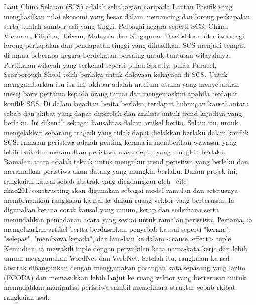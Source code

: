 \documentclass[twoside]{utmthesis}
\begin{document}
\begin{abstrak}
Laut China Selatan (SCS) adalah sebahagian daripada Lautan Pasifik yang menghasilkan nilai ekonomi yang besar dalam memancing dan lorong perkapalan serta jumlah sumber asli yang tinggi. Pelbagai negara seperti SCS, China, Vietnam, Filipina, Taiwan, Malaysia dan Singapura. Disebabkan lokasi strategi lorong perkapalan dan pendapatan tinggi yang dihasilkan, SCS menjadi tempat di mana beberapa negara berdekatan bersaing untuk tuntutan wilayahnya. Pertikaian wilayah yang terkenal seperti pulau Spratly, pulau Paracel, Scarborough Shoal telah berlaku untuk dakwaan kekayaan di SCS. Untuk menggambarkan isu-isu ini, akhbar adalah medium utama yang menyebarkan mesej baris pertama kepada orang ramai dan mengemaskini apabila terdapat konflik SCS. Di dalam kejadian berita berlaku, terdapat hubungan kausal antara sebab dan akibat yang dapat diperoleh dan analisis untuk trend kejadian yang berlaku. Ini dikenali sebagai kausalitas dalam artikel berita. Selain itu, untuk mengelakkan sebarang tragedi yang tidak dapat dielakkan berlaku dalam konflik SCS, ramalan peristiwa adalah penting kerana ia memberikan wawasan yang lebih baik dan meramalkan peristiwa masa depan yang mungkin berlaku. Ramalan acara adalah teknik untuk mengukur trend peristiwa yang berlaku dan meramalkan peristiwa akan datang yang mungkin berlaku. Dalam projek ini, rangkaian kausal sebab abstrak yang dicadangkan oleh \ cite {zhao2017constructing} akan digunakan sebagai model ramalan dan seterusnya membenamkan rangkaian kausal ke dalam ruang vektor yang berterusan. Ia digunakan kerana corak kausal yang umum, kerap dan sederhana serta memudahkan pemadanan acara yang sesuai untuk ramalan peristiwa. Pertama, ia mengeluarkan artikel berita berdasarkan penyebab kausal seperti "kerana", "selepas", "membawa kepada", dan lain-lain ke dalam <cause, effect> tuple. Kemudian, ia mewakili tuple dengan perwakilan kata nama-kata kerja dan lebih umum menggunakan WordNet dan VerbNet. Setelah itu, rangkaian kausal abstrak dibangunkan dengan menggunakan pasangan kata sepasang yang lazim (FCOPA) dan memasukkan lebih lanjut ke ruang vektor yang berterusan untuk memudahkan manipulasi peristiwa sambil memelihara struktur sebab-akibat rangkaian asal.
\end{abstrak}


\tableofcontents
\listoftables
\listoffigures


\listofabbre
\newline
{}
\end{document}
